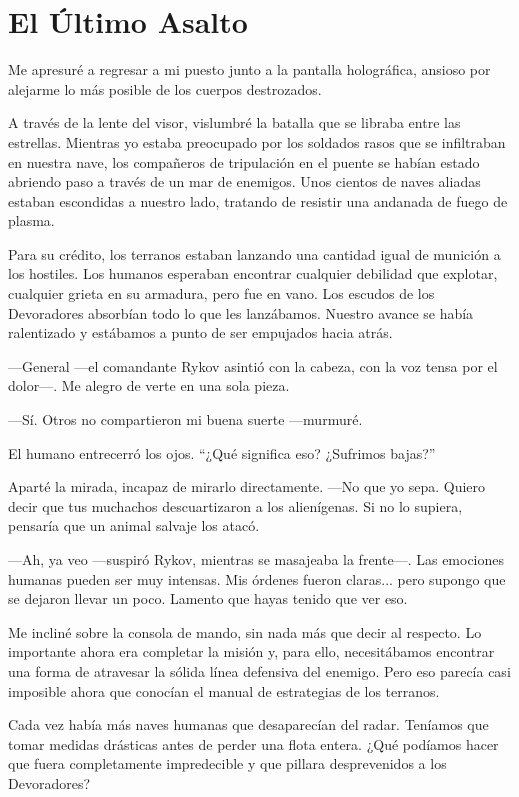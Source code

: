 \chapter{El Último Asalto}\label{sec:el-ultimo-asalto}

Me apresuré a regresar a mi puesto junto a la pantalla holográfica, ansioso por alejarme lo más posible de los cuerpos destrozados.

A través de la lente del visor, vislumbré la batalla que se libraba entre las estrellas. Mientras yo estaba preocupado por los soldados rasos que se infiltraban en nuestra nave, los compañeros de tripulación en el puente se habían estado abriendo paso a través de un mar de enemigos. Unos cientos de naves aliadas estaban escondidas a nuestro lado, tratando de resistir una andanada de fuego de plasma.

Para su crédito, los terranos estaban lanzando una cantidad igual de munición a los hostiles. Los humanos esperaban encontrar cualquier debilidad que explotar, cualquier grieta en su armadura, pero fue en vano. Los escudos de los Devoradores absorbían todo lo que les lanzábamos. Nuestro avance se había ralentizado y estábamos a punto de ser empujados hacia atrás.

—General —el comandante Rykov asintió con la cabeza, con la voz tensa por el dolor—. Me alegro de verte en una sola pieza.

—Sí. Otros no compartieron mi buena suerte —murmuré.

El humano entrecerró los ojos. ``¿Qué significa eso? ¿Sufrimos bajas?''


Aparté la mirada, incapaz de mirarlo directamente. —No que yo sepa. Quiero decir que tus muchachos descuartizaron a los alienígenas. Si no lo supiera, pensaría que un animal salvaje los atacó.

—Ah, ya veo —suspiró Rykov, mientras se masajeaba la frente—. Las emociones humanas pueden ser muy intensas. Mis órdenes fueron claras... pero supongo que se dejaron llevar un poco. Lamento que hayas tenido que ver eso.

Me incliné sobre la consola de mando, sin nada más que decir al respecto. Lo importante ahora era completar la misión y, para ello, necesitábamos encontrar una forma de atravesar la sólida línea defensiva del enemigo. Pero eso parecía casi imposible ahora que conocían el manual de estrategias de los terranos.

Cada vez había más naves humanas que desaparecían del radar. Teníamos que tomar medidas drásticas antes de perder una flota entera. ¿Qué podíamos hacer que fuera completamente impredecible y que pillara desprevenidos a los Devoradores?

